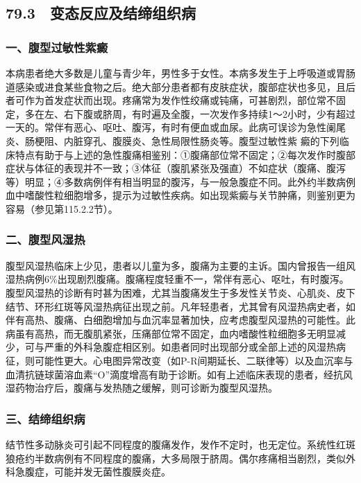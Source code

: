 \subsection{79.3　变态反应及结缔组织病}

\subsubsection{一、腹型过敏性紫癜}

本病患者绝大多数是儿童与青少年，男性多于女性。本病多发生于上呼吸道或胃肠道感染或进食某些食物之后。绝大部分患者都有皮肤症状，腹部症状也多见，且后者可作为首发症状而出现。疼痛常为发作性绞痛或钝痛，可甚剧烈，部位常不固定，多在左、右下腹或脐周，有时遍及全腹，一次发作多持续1～2小时，少有超过一天的。常伴有恶心、呕吐、腹泻，有时有便血或血尿。此病可误诊为急性阑尾炎、肠梗阻、内脏穿孔、腹膜炎、急性局限性肠炎等。腹型过敏性紫
癜的下列临床特点有助于与上述的急性腹痛相鉴别：①腹痛部位常不固定；②每次发作时腹部症状与体征的表现并不一致；③体征（腹肌紧张及强直）不如症状（腹痛、腹泻等）明显；④多数病例伴有相当明显的腹泻，与一般急腹症不同。此外约半数病例血中嗜酸性粒细胞增多，提示为过敏性疾病。如出现紫癜与关节肿痛，则鉴别更为容易（参见第115.2.2节）。

\subsubsection{二、腹型风湿热}

腹型风湿热临床上少见，患者以儿童为多，腹痛为主要的主诉。国内曾报告一组风湿热病例6\%出现剧烈腹痛。腹痛程度轻重不一，常伴有恶心、呕吐，有时腹泻。腹型风湿热的诊断有时甚为困难，尤其当腹痛发生于多发性关节炎、心肌炎、皮下结节、环形红斑等风湿热病征出现之前。凡年轻患者，尤其曾有风湿热病史者，如伴有高热、腹痛、白细胞增加与血沉率显著加快，应考虑腹型风湿热的可能性。此病虽有高热，而无腹肌紧张，压痛部位常不固定，血内嗜酸性粒细胞多无明显减少，可与严重的外科急腹症相区别。如患者同时出现部分或全部上述的风湿热病征，则可能性更大。心电图异常改变（如P-R间期延长、二联律等）以及血沉率与血清抗链球菌溶血素“O”滴度增高有助于诊断。如有上述临床表现的患者，经抗风湿药物治疗后，腹痛与发热随之缓解，则可诊断为腹型风湿热。

\subsubsection{三、结缔组织病}

结节性多动脉炎可引起不同程度的腹痛发作，发作不定时，也无定位。系统性红斑狼疮约半数病例有不同程度的腹痛，大多局限于脐周。偶尔疼痛相当剧烈，类似外科急腹症，可能并发无菌性腹膜炎症。

